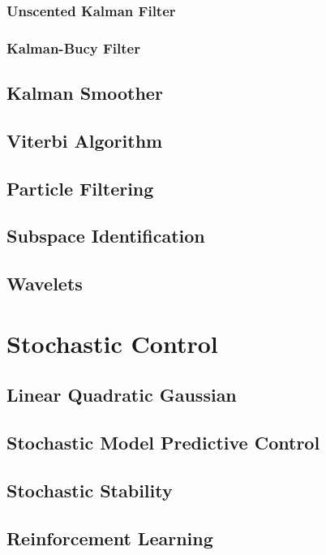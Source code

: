 \documentclass[11pt]{report} %
\begin{document}
\subsection{Unscented Kalman Filter}

\subsection{Kalman-Bucy Filter}

\section{Kalman Smoother}

\section{Viterbi Algorithm}

\section{Particle Filtering}

\section{Subspace Identification}

\section{Wavelets}

\chapter{Stochastic Control}

\section{Linear Quadratic Gaussian}

\section{Stochastic Model Predictive Control}

\section{Stochastic Stability}

\section{Reinforcement Learning}
\end{document}
